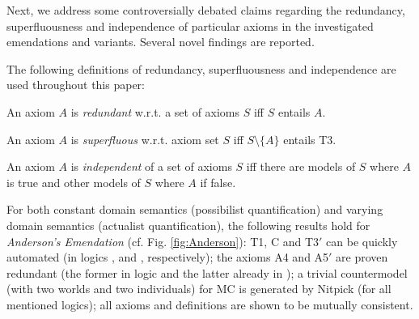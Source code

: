 \documentclass{birkjour}
\theoremstyle{definition}
\theoremstyle{remark}
\numberwithin{equation}{section}
\begin{document}
Next, we address some controversially debated claims regarding the redundancy,
superfluousness and independence of particular axioms in the
investigated emendations and variants. Several novel findings are
reported.

The following definitions of redundancy, superfluousness and independence are used throughout this paper:

\begin{definition}
An axiom $A$ is \emph{redundant} w.r.t. a set of axioms $S$ iff $S$ entails $A$. 
\end{definition}

\begin{definition}
An axiom $A$ is \emph{superfluous} w.r.t. axiom set $S$ iff $S \setminus \{ A \}$ entails T3.
\end{definition}

\begin{definition}
  An axiom $A$ is \emph{independent} of a set of axioms $S$ iff
  there are models of $S$ where $A$ is true and other models of
  $S$ where $A$ if false.
\end{definition}


For both {constant domain semantics} (possibilist quantification) and {varying domain
semantics} (actualist quantification), the following results hold for \emph{Anderson's
Emendation} (cf. Fig. \ref{fig:Anderson}): T1, C
and T3$'$ can be quickly automated (in logics \K, \K and \KB,
respectively); the axioms A4 and A5$'$ are proven redundant (the former in logic \KFourB and the latter
already in \K); a trivial countermodel (with two worlds and  two
individuals) for MC is generated by Nitpick (for all mentioned
logics); all axioms and definitions are shown to be mutually
consistent.
\end{document}
